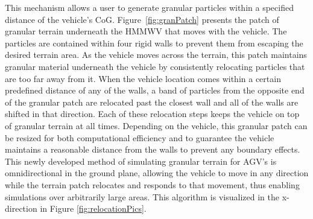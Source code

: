 \documentclass[12pt,onecolumn]{report}
\newcommand{\CHRONO}{{\sffamily{{Chrono}}}}
\begin{document}
This mechanism allows a user to generate granular particles within a specified distance of the vehicle's CoG. Figure~\ref{fig:granPatch} presents the patch of granular terrain underneath the {\CHRONO}  HMMWV that moves with the vehicle. The particles are contained within four rigid walls to prevent them from escaping the desired terrain area. As the vehicle moves across the terrain, this patch maintains granular material underneath the vehicle by consistently relocating particles that are too far away from it. When the vehicle location comes within a certain predefined distance of any of the walls, a band of particles from the opposite end of the granular patch are relocated past the closest wall and all of the walls are shifted in that direction. Each of these relocation steps keeps the vehicle on top of granular terrain at all times. Depending on the vehicle, this granular patch can be resized for both computational efficiency and to guarantee the vehicle maintains a reasonable distance from the walls to prevent any boundary effects. This newly developed method of simulating granular terrain for AGV's is omnidirectional in the ground plane, allowing the vehicle to move in any direction while the terrain patch relocates and responds to that movement, thus enabling simulations over arbitrarily large areas. This algorithm is visualized in the x-direction in Figure \ref{fig:relocationPics}.
\end{document}
